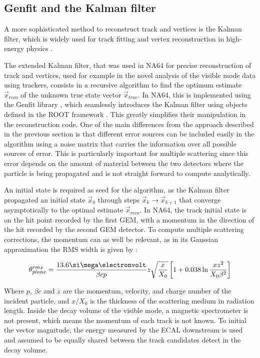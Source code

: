 \subsection{Genfit and the Kalman filter}
\label{appD:sec:kalman-filter}

A more sophisticated method to reconstruct track and vertices is the Kalman filter, which is widely used for track fitting and vertex reconstruction in high-energy physics \cite{HOPPNER2010518}.

The extended Kalman filter, that was used in NA64 for precise reconstruction of track and vertices, used for example in the novel analysis of the visible mode data using trackers, consists in a recursive algorithm to find the optimum estimate $\vec{x}_{reco}$ of the unknown true state vector $\vec{x}_{true}$. In NA64, this is implemented using the Genfit library \cite{genfit}, which seamlessly introduces the Kalman filter using objects defined in the ROOT framework \cite{root}. This greatly simplifies their manipulation in the reconstruction code. One of the main differences from the approach described in the previous section is that different error sources can be included easily in the algorithm using a noise matrix that carries the information over all possible sources of error. This is particularly important for multiple scattering since this error depends on the amount of material between the two detectors where the particle is being propagated and is not straight forward to compute analytically.

An initial state is required as seed for the algorithm, as the Kalman filter propagated an initial state $\vec{x}_0$ through steps $\vec{x}_k \rightarrow \vec{x}_{k+1}$ that converge asymptotically to the optimal estimate $\vec{x}_{reco}$. In NA64, the track initial state is on the hit point recorded by the first GEM, with a momentum in the direction of the hit recorded by the second GEM detector. To compute multiple scattering corrections, the momentum can as well be relevant, as in its Gaussian approximation the RMS width is given by \cite{review-particle-physics}:

\begin{equation}
  \label{eq:mm-scattering}
  \theta_{plane}^{rms} = \frac{13.6 \mev}{\beta c p} z \sqrt{\frac{x}{X_0}} \left[ 1 + 0.038 \ln{\frac{x z^2}{X_0 \beta^2}} \right]
\end{equation}

Where $p$, $\beta c$ and $z$ are the momentum, velocity, and charge number of the incident particle, and $x/X_0$ is the thickness of the scattering medium in radiation length. Inside the decay volume of the visible mode, a magnetic spectrometer is not present, which means the momentum of each track is not known. To initial the vector magnitude, the energy measured by the ECAL downstream is used and assumed to be equally shared between the track candidates detect in the decay volume.

